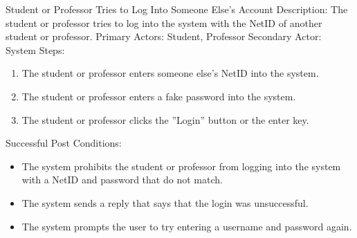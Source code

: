     \begin{section}{Student or Professor Tries to Log Into Someone Else's Account}
        Description: The student or professor tries to log into the  system with the NetID of another student or professor. \newline
        Primary Actors: Student, Professor \newline
        Secondary Actor: System \newline
        Steps:
        \begin{enumerate}
            \item{The student or professor enters someone else's NetID into the system.}
            \item{The student or professor enters a fake password into the system.}
            \item{The student or professor clicks the ''Login'' button or the enter key.}
        \end{enumerate}
        Successful Post Conditions:
        \begin{itemize}
            \item{The system prohibits the student or professor from logging into the system with a NetID and password that do not match.}
            \item{The system sends a reply that says that the login was unsuccessful.}
            \item{The system prompts the user to try entering a username and password again.}
        \end{itemize}
    \end{section}
    
